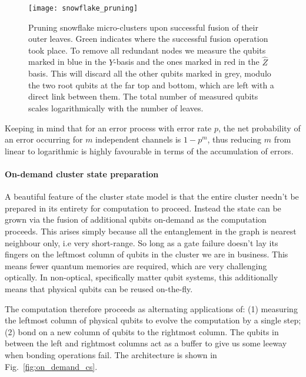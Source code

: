 \begin{figure}[htpb]
\texttt{[image: snowflake\_pruning]}
\caption{Pruning snowflake micro-clusters upon successful fusion of their outer leaves. Green indicates where the successful fusion operation took place. To remove all redundant nodes we measure the qubits marked in blue in the $\hat{Y}$-basis and the ones marked in red in the $\hat{Z}$ basis. This will discard all the other qubits marked in grey, modulo the two root qubits at the far top and bottom, which are left with a direct link between them. The total number of measured qubits scales logarithmically with the number of leaves.}\label{fig:snowflake_pruning}	
\end{figure}

Keeping in mind that for an error process with error rate $p$, the net probability of an error occurring for $m$ independent channels is \mbox{$1-p^m$}, thus reducing $m$ from linear to logarithmic is highly favourable in terms of the accumulation of errors.

%
%

\paragraph{On-demand cluster state preparation}

A beautiful feature of the cluster state model is that the entire cluster needn't be prepared in its entirety for computation to proceed. Instead the state can be grown via the fusion of additional qubits on-demand as the computation proceeds. This arises simply because all the entanglement in the graph is nearest neighbour only, i.e very short-range. So long as a gate failure doesn't lay its fingers on the leftmost column of qubits in the cluster we are in business. This means fewer quantum memories are required, which are very challenging optically. In non-optical, specifically matter qubit systems, this additionally means that physical qubits can be reused on-the-fly.

The computation therefore proceeds as alternating applications of: (1) measuring the leftmost column of physical qubits to evolve the computation by a single step; (2) bond on a new column of qubits to the rightmost column. The qubits in between the left and rightmost columns act as a buffer to give us some leeway when bonding operations fail. The architecture is shown in Fig.~\ref{fig:on_demand_cs}.


